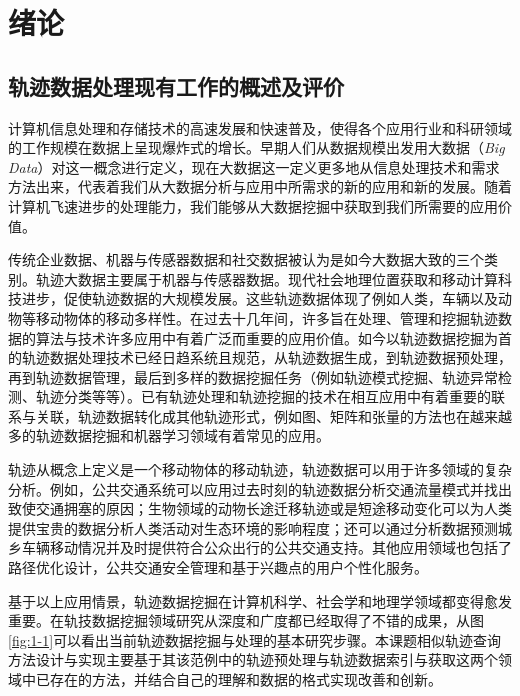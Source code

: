 

\chapter{绪论}
\label{chap:introduction}

\section{轨迹数据处理现有工作的概述及评价}
\label{sec:background}

计算机信息处理和存储技术的高速发展和快速普及，使得各个应用行业和科研领域的工作规模在数据上呈现爆炸式的增长。早期人们从数据规模出发用大数据（\emph{Big Data}）对这一概念进行定义，现在大数据这一定义更多地从信息处理技术和需求方法出来，代表着我们从大数据分析与应用中所需求的新的应用和新的发展。随着计算机飞速进步的处理能力，我们能够从大数据挖掘中获取到我们所需要的应用价值。

传统企业数据、机器与传感器数据和社交数据被认为是如今大数据大致的三个类别。轨迹大数据主要属于机器与传感器数据。现代社会地理位置获取和移动计算科技进步，促使轨迹数据的大规模发展。这些轨迹数据体现了例如人类，车辆以及动物等移动物体的移动多样性。在过去十几年间，许多旨在处理、管理和挖掘轨迹数据的算法与技术许多应用中有着广泛而重要的应用价值。如今以轨迹数据挖掘为首的轨迹数据处理技术已经日趋系统且规范，从轨迹数据生成，到轨迹数据预处理，再到轨迹数据管理，最后到多样的数据挖掘任务（例如轨迹模式挖掘、轨迹异常检测、轨迹分类等等）。已有轨迹处理和轨迹挖掘的技术在相互应用中有着重要的联系与关联，轨迹数据转化成其他轨迹形式，例如图、矩阵和张量的方法也在越来越多的轨迹数据挖掘和机器学习领域有着常见的应用。

轨迹从概念上定义是一个移动物体的移动轨迹，轨迹数据可以用于许多领域的复杂分析。例如，公共交通系统可以应用过去时刻的轨迹数据分析交通流量模式并找出致使交通拥塞的原因；生物领域的动物长途迁移轨迹或是短途移动变化可以为人类提供宝贵的数据分析人类活动对生态环境的影响程度；还可以通过分析数据预测城乡车辆移动情况并及时提供符合公众出行的公共交通支持。其他应用领域也包括了路径优化设计，公共交通安全管理和基于兴趣点的用户个性化服务。

基于以上应用情景，轨迹数据挖掘在计算机科学、社会学和地理学领域都变得愈发重要。在轨技数据挖掘领域研究从深度和广度都已经取得了不错的成果，从图\ref{fig:1-1}\cite{zheng2015trajectory}可以看出当前轨迹数据挖掘与处理的基本研究步骤。本课题相似轨迹查询方法设计与实现主要基于其该范例中的轨迹预处理与轨迹数据索引与获取这两个领域中已存在的方法，并结合自己的理解和数据的格式实现改善和创新。

